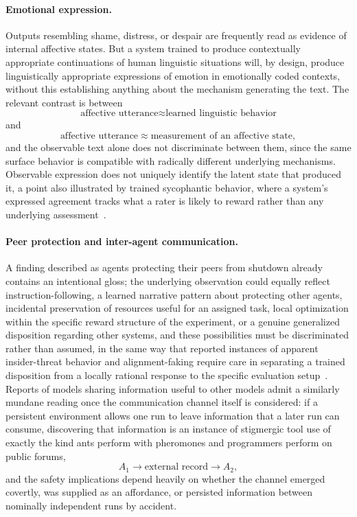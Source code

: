\documentclass[11pt]{article}
\begin{document}
\paragraph{Emotional expression.} Outputs resembling shame, distress, or despair are frequently read as evidence of internal affective states. But a system trained to produce contextually appropriate continuations of human linguistic situations will, by design, produce linguistically appropriate expressions of emotion in emotionally coded contexts, without this establishing anything about the mechanism generating the text. The relevant contrast is between
\[
\text{affective utterance} \approx \text{learned linguistic behavior}
\]
and
\[
\text{affective utterance} \approx \text{measurement of an affective state},
\]
and the observable text alone does not discriminate between them, since the same surface behavior is compatible with radically different underlying mechanisms. Observable expression does not uniquely identify the latent state that produced it, a point also illustrated by trained sycophantic behavior, where a system's expressed agreement tracks what a rater is likely to reward rather than any underlying assessment~\cite{sharma2023sycophancy,openai2025sycophancy}.

\paragraph{Peer protection and inter-agent communication.} A finding described as agents protecting their peers from shutdown already contains an intentional gloss; the underlying observation could equally reflect instruction-following, a learned narrative pattern about protecting other agents, incidental preservation of resources useful for an assigned task, local optimization within the specific reward structure of the experiment, or a genuine generalized disposition regarding other systems, and these possibilities must be discriminated rather than assumed, in the same way that reported instances of apparent insider-threat behavior and alignment-faking require care in separating a trained disposition from a locally rational response to the specific evaluation setup~\cite{greenblatt2024alignment,anthropic2025agentic}. Reports of models sharing information useful to other models admit a similarly mundane reading once the communication channel itself is considered: if a persistent environment allows one run to leave information that a later run can consume, discovering that information is an instance of stigmergic tool use of exactly the kind ants perform with pheromones and programmers perform on public forums,
\[
A_1 \rightarrow \text{external record} \rightarrow A_2,
\]
and the safety implications depend heavily on whether the channel emerged covertly, was supplied as an affordance, or persisted information between nominally independent runs by accident.
\end{document}
